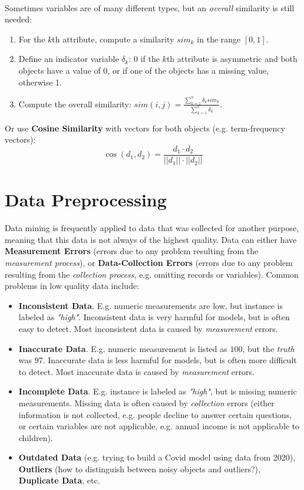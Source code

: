 \documentclass[12pt]{article}
\begin{document}
\noindent
\\
Sometimes variables are of many different types, but an \textit{overall} similarity is still needed:

\begin{enumerate}
    \item For the $k$th attribute, compute a similarity $sim_k$ in the range $[0, 1]$.
    \item Define an indicator variable $\delta_k$: 0 if the $k$th attribute is asymmetric and both objects have a value of 0, or if one of the objects has a missing value, otherwise 1.
    \item Compute the overall similarity: $sim(i, j) = \displaystyle\frac{\sum_{k = 1}^n \delta_k sim_k}{\sum_{k = 1}^n \delta_k}$.
\end{enumerate}

\noindent
Or use \textbf{Cosine Similarity} with vectors for both objects (e.g. term-frequency vectors):
\[ \cos(d_1, d_2) = \frac{d_1 \cdot d_2}{||d_1|| \cdot ||d_2||} \]

%
%
\newpage
\section{Data Preprocessing}
Data mining is frequently applied to data that was collected for another purpose, meaning that this data is not always of the highest quality.
Data can either have \textbf{Measurement Errors} (errors due to any problem resulting from the \textit{measurement process}), or \textbf{Data-Collection Errors} (errors due to any problem resulting from the \textit{collection process}, e.g. omitting records or variables).
Common problems in low quality data include:

\begin{itemize}
    \item \textbf{Inconsistent Data}. E.g. numeric measurements are low, but instance is labeled as \textit{"high"}. Inconsistent data is very harmful for models, but is often easy to detect. Most inconsistent data is caused by \textit{measurement} errors.
    \item \textbf{Inaccurate Data}. E.g. numeric measurement is listed as $100$, but the \textit{truth} was $97$. Inaccurate data is less harmful for models, but is often more difficult to detect. Most inaccurate data is caused by \textit{measurement} errors.
    \item \textbf{Incomplete Data}. E.g. instance is labeled as \textit{"high"}, but is missing numeric measurements. Missing data is often caused by \textit{collection} errors (either information is not collected, e.g. people decline to answer certain questions, or certain variables are not applicable, e.g. annual income is not applicable to children).
    \item \textbf{Outdated Data} (e.g. trying to build a Covid model using data from 2020), \textbf{Outliers} (how to distinguish between noisy objects and outliers?), \textbf{Duplicate Data}, etc.
\end{itemize}
\end{document}
